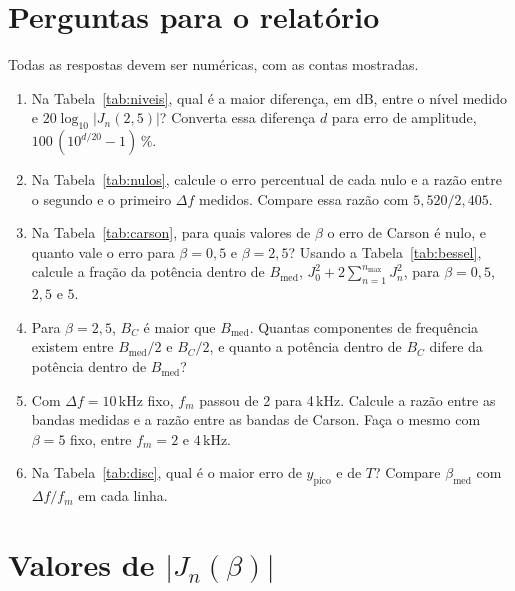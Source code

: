 \documentclass[11pt,a4paper]{article}
\begin{document}
\section{Perguntas para o relatório}

Todas as respostas devem ser numéricas, com as contas mostradas.

\begin{enumerate}[label=\textbf{Q\arabic*.}, leftmargin=*]

  \item Na Tabela~\ref{tab:niveis}, qual é a maior diferença, em dB, entre o
        nível medido e $20\log_{10}|J_n(2{,}5)|$? Converta essa diferença $d$ para
        erro de amplitude, $100\,(10^{d/20}-1)\,\%$.

  \item Na Tabela~\ref{tab:nulos}, calcule o erro percentual de cada nulo e a
        razão entre o segundo e o primeiro $\Delta f$ medidos. Compare essa razão
        com $5{,}520/2{,}405$.

  \item Na Tabela~\ref{tab:carson}, para quais valores de $\beta$ o erro de
        Carson é nulo, e quanto vale o erro para $\beta=0{,}5$ e $\beta=2{,}5$?
        Usando a Tabela~\ref{tab:bessel}, calcule a fração da potência dentro de
        $B_{\text{med}}$, $J_0^2+2\sum_{n=1}^{n_{\max}}J_n^2$, para $\beta = 0{,}5$,
        $2{,}5$ e $5$.

  \item Para $\beta = 2{,}5$, $B_C$ é maior que $B_{\text{med}}$. Quantas
        componentes de frequência existem entre $B_{\text{med}}/2$ e $B_C/2$, e
        quanto a potência dentro de $B_C$ difere da potência dentro de
        $B_{\text{med}}$?

  \item Com $\Delta f = 10$\,kHz fixo, $f_m$ passou de 2 para 4\,kHz. Calcule a
        razão entre as bandas medidas e a razão entre as bandas de Carson. Faça o
        mesmo com $\beta = 5$ fixo, entre $f_m = 2$ e $4$\,kHz.

  \item Na Tabela~\ref{tab:disc}, qual é o maior erro de $y_{\text{pico}}$ e de
        $T$? Compare $\beta_{\text{med}}$ com $\Delta f/f_m$ em cada linha.

\end{enumerate}

\appendix
\section{Valores de $|J_n(\beta)|$}
\end{document}
